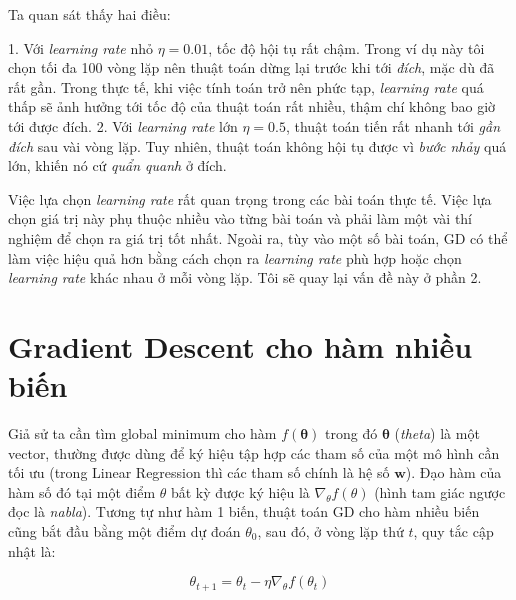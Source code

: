 Ta quan sát thấy hai điều: 
 
1. Với \textit{learning rate} nhỏ $\eta = 0.01$, tốc độ hội tụ rất chậm. Trong ví dụ này tôi chọn tối đa 100 vòng lặp nên thuật toán dừng lại trước khi tới \textit{đích}, mặc dù đã rất gần. Trong thực tế, khi việc tính toán trở nên phức tạp, \textit{learning rate} quá thấp sẽ ảnh hưởng tới tốc độ của thuật toán rất nhiều, thậm chí không bao giờ tới được đích.  
2. Với \textit{learning rate} lớn $\eta = 0.5$, thuật toán tiến rất nhanh tới \textit{gần đích} sau vài vòng lặp. Tuy nhiên, thuật toán không hội tụ được vì \textit{bước nhảy} quá lớn, khiến nó cứ \textit{quẩn quanh} ở đích.  
 
Việc lựa chọn \textit{learning rate} rất quan trọng trong các bài toán thực tế. Việc lựa chọn giá trị này phụ thuộc nhiều vào từng bài toán và phải làm một vài thí nghiệm để chọn ra giá trị tốt nhất. Ngoài ra, tùy vào một số bài toán, GD có thể làm việc hiệu quả hơn bằng cách chọn ra \textit{learning rate} phù hợp hoặc chọn \textit{learning rate} khác nhau ở mỗi vòng lặp. Tôi sẽ quay lại vấn đề này ở phần 2.  
 
 
\section{Gradient Descent cho hàm nhiều biến}
Giả sử ta cần tìm global minimum cho hàm $f(\mathbf{\theta})$ trong đó $\mathbf{\theta}$ (\textit{theta}) là một vector, thường được dùng để ký hiệu tập hợp các tham số của một mô hình cần tối ưu (trong Linear Regression thì các tham số chính là hệ số $\mathbf{w}$). Đạo hàm của hàm số đó tại một điểm $\theta$ bất kỳ được ký hiệu là $\nabla_{\theta}f(\theta)$ (hình tam giác ngược đọc là \textit{nabla}). Tương tự như hàm 1 biến, thuật toán GD cho hàm nhiều biến cũng bắt đầu bằng một điểm dự đoán $\theta_{0}$, sau đó, ở vòng lặp thứ $t$, quy tắc cập nhật là: 
 
\begin{equation*} 
\theta_{t+1} = \theta_t - \eta \nabla_{\theta} f(\theta_t) 
\end{equation*} 
 
